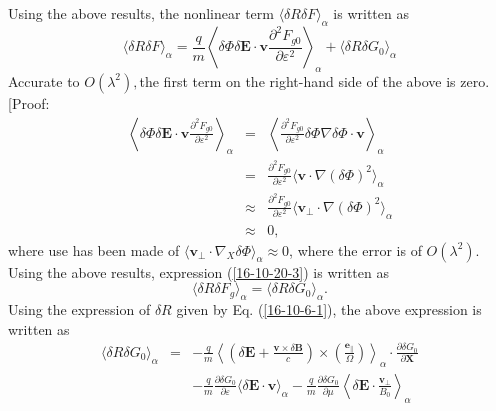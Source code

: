 \documentclass{article}
\newcommand{\tmmathbf}[1]{\ensuremath{\boldsymbol{#1}}}
\begin{document}
Using the above results, the nonlinear term $\langle \delta R \delta F
\rangle_{\alpha}$ is written as
\begin{equation}
  \label{16-10-20-3} \langle \delta R \delta F \rangle_{\alpha} = \frac{q}{m}
  \left\langle \delta \Phi \delta \mathbf{E} \cdot \mathbf{v} \frac{\partial^2
  F_{g 0}}{\partial \varepsilon^2} \right\rangle_{\alpha} + \langle \delta R
  \delta G_0 \rangle_{\alpha}
\end{equation}
Accurate to $O (\lambda^2),$the first term on the right-hand side of the above
is zero. [Proof:
\begin{eqnarray}
  \left\langle \delta \Phi \delta \mathbf{E} \cdot \mathbf{v} \frac{\partial^2
  F_{g 0}}{\partial \varepsilon^2} \right\rangle_{\alpha} & = & \left\langle
  \frac{\partial^2 F_{g 0}}{\partial \varepsilon^2} \delta \Phi \nabla \delta
  \Phi \cdot \mathbf{v} \right\rangle_{\alpha} \nonumber\\
  & = & \frac{\partial^2 F_{g 0}}{\partial \varepsilon^2} \langle \mathbf{v}
  \cdot \nabla (\delta \Phi)^2 \rangle_{\alpha} \nonumber\\
  & \approx & \frac{\partial^2 F_{g 0}}{\partial \varepsilon^2} \langle
  \mathbf{v}_{\perp} \cdot \nabla (\delta \Phi)^2 \rangle_{\alpha} \nonumber\\
  & \approx & 0, 
\end{eqnarray}
where use has been made of $\langle \mathbf{v}_{\perp} \cdot \nabla_X \delta
\Phi \rangle_{\alpha} \approx 0$, where the error is of $O (\lambda^2)$. Using
the above results, expression (\ref{16-10-20-3}) is written as
\begin{equation}
  \label{16-10-20-7} \langle \delta R \delta F_g \rangle_{\alpha} = \langle
  \delta R \delta G_0 \rangle_{\alpha} .
\end{equation}
Using the expression of $\delta R$ given by Eq. (\ref{16-10-6-1}), the above
expression is written as
\begin{eqnarray}
  \langle \delta R \delta G_0 \rangle_{\alpha} & = & - \frac{q}{m}
  \left\langle \left( \delta \mathbf{E}+ \frac{\mathbf{v} \times \delta
  \mathbf{B}}{c} \right) \times \left( \frac{\tmmathbf{e}_{\parallel}}{\Omega}
  \right) \right\rangle_{\alpha} \cdot \frac{\partial \delta G_0}{\partial
  \mathbf{X}} \nonumber\\
  &  & - \frac{q}{m}  \frac{\partial \delta G_0}{\partial \varepsilon}
  \langle \delta \mathbf{E} \cdot \mathbf{v} \rangle_{\alpha} - \frac{q}{m} 
  \frac{\partial \delta G_0}{\partial \mu} \left\langle \delta \mathbf{E}
  \cdot \frac{\mathbf{v}_{\perp}}{B_0} \right\rangle_{\alpha} 
  \label{16-10-20-5}
\end{eqnarray}
\end{document}
